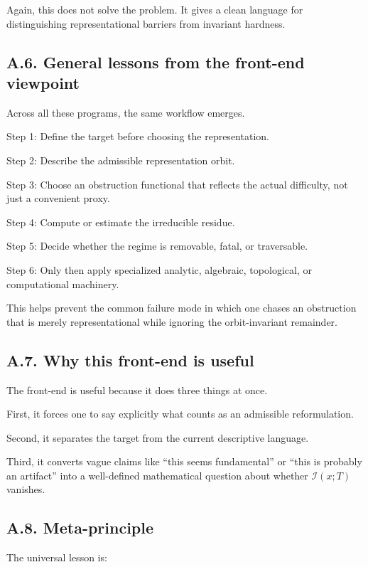\documentclass[
]{article}
\begin{document}
Again, this does not solve the problem. It gives a clean language for
distinguishing representational barriers from invariant hardness.

\subsection{A.6. General lessons from the front-end
viewpoint}\label{a.6.-general-lessons-from-the-front-end-viewpoint}

Across all these programs, the same workflow emerges.

Step 1: Define the target before choosing the representation.

Step 2: Describe the admissible representation orbit.

Step 3: Choose an obstruction functional that reflects the actual
difficulty, not just a convenient proxy.

Step 4: Compute or estimate the irreducible residue.

Step 5: Decide whether the regime is removable, fatal, or traversable.

Step 6: Only then apply specialized analytic, algebraic, topological, or
computational machinery.

This helps prevent the common failure mode in which one chases an
obstruction that is merely representational while ignoring the
orbit-invariant remainder.

\subsection{A.7. Why this front-end is
useful}\label{a.7.-why-this-front-end-is-useful}

The front-end is useful because it does three things at once.

First, it forces one to say explicitly what counts as an admissible
reformulation.

Second, it separates the target from the current descriptive language.

Third, it converts vague claims like ``this seems fundamental'' or
``this is probably an artifact'' into a well-defined mathematical
question about whether \(\mathcal{I}(x;T)\) vanishes.

\subsection{A.8. Meta-principle}\label{a.8.-meta-principle}

The universal lesson is:
\end{document}
